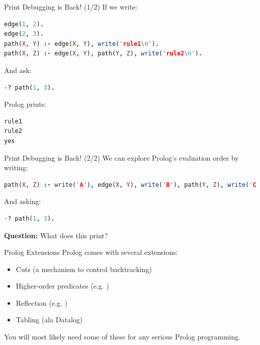 \begin{frame}[fragile]{Print Debugging is Back! (1/2)}
If we write: 

\begin{lstlisting}[language=prolog, xleftmargin=0.5cm]
edge(1, 2).
edge(2, 3).
path(X, Y) :- edge(X, Y), write('rule1\n').
path(X, Z) :- edge(X, Y), path(Y, Z), write('rule2\n').
\end{lstlisting}

And ask:

\begin{lstlisting}[language=prolog, xleftmargin=0.5cm]
-? path(1, 3).
\end{lstlisting}

Prolog prints:

\begin{lstlisting}[language=prolog, xleftmargin=0.5cm]
rule1
rule2
yes
\end{lstlisting}
\end{frame}

\begin{frame}[fragile]{Print Debugging is Back! (2/2)}
We can explore Prolog's evaluation order by writing:

\begin{lstlisting}[language=prolog, xleftmargin=0.5cm]
path(X, Z) :- write('A'), edge(X, Y), write('B'), path(Y, Z), write('C').
\end{lstlisting}

And asking:

\begin{lstlisting}[language=prolog, xleftmargin=0.5cm]
-? path(1, 3).
\end{lstlisting}

\textbf{Question:} What does this print?
\end{frame}

\begin{frame}{Prolog Extensions}
Prolog comes with several extensions:

\begin{itemize}
    \item Cuts (a mechanism to control backtracking)
    \item Higher-order predicates (e.g. )
    \item Reflection (e.g. )
    \item Tabling (ala Datalog)
\end{itemize}

You will most likely need some of these for any serious Prolog programming. 
\end{frame}

